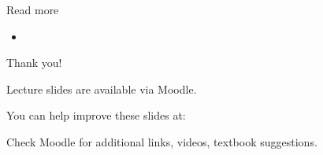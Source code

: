 \documentclass{beamer}
\begin{document}
\begin{frame}{Read more}

\begin{itemize}
\item {}


\end{itemize}

\end{frame}



\begin{frame}{Thank you!}
\centerline{Lecture slides are available via Moodle.}
\bigskip
\centerline{You can help improve these slides at:}
\centerline{\mygit}
\bigskip
\centerline{Check Moodle for additional links, videos, textbook suggestions.}
\bigskip

\centerline{\textcolor{black}{}}
\end{frame}
\end{document}
